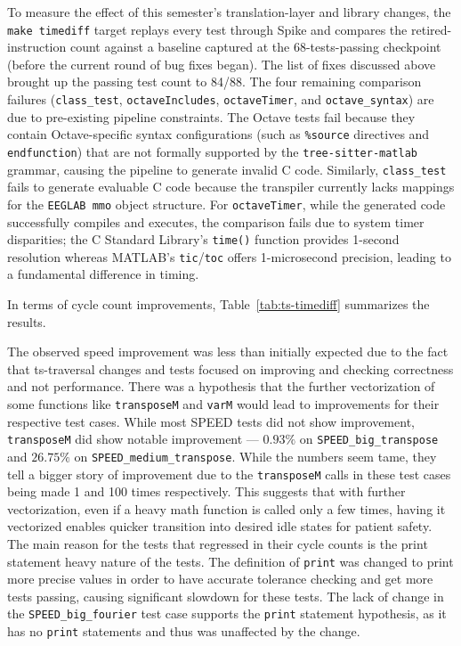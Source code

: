 To measure the effect of this semester's translation-layer and library changes, the \texttt{make timediff} target replays every test through Spike and compares the retired-instruction count against a baseline captured at the 68-tests-passing checkpoint (before the current round of bug fixes began). The list of fixes discussed above brought up the passing test count to 84/88.  The four remaining comparison failures (\texttt{class\_test}, \texttt{octaveIncludes}, \texttt{octaveTimer}, and \texttt{octave\_syntax}) are due to pre-existing pipeline constraints. The Octave tests fail because they contain Octave-specific syntax configurations (such as \texttt{\%source} directives and \texttt{endfunction}) that are not formally supported by the \texttt{tree-sitter-matlab} grammar, causing the pipeline to generate invalid C code. Similarly, \texttt{class\_test} fails to generate evaluable C code because the transpiler currently lacks mappings for the \texttt{EEGLAB mmo} object structure. For \texttt{octaveTimer}, while the generated code successfully compiles and executes, the comparison fails due to system timer disparities; the C Standard Library's \texttt{time()} function provides 1-second resolution whereas MATLAB's \texttt{tic}/\texttt{toc} offers 1-microsecond precision, leading to a fundamental difference in timing.

In terms of cycle count improvements, Table~\ref{tab:ts-timediff} summarizes the results.



The observed speed improvement was less than initially expected due to the fact that ts-traversal changes and tests focused on improving and checking correctness and not performance. There was a hypothesis that the further vectorization of some functions like \texttt{transposeM} and \texttt{varM} would lead to improvements for their respective test cases. While most SPEED tests did not show improvement, \texttt{transposeM} did show notable improvement --- $0.93\%$ on \texttt{SPEED\_big\_transpose} and $26.75\%$ on \texttt{SPEED\_medium\_transpose}. While the numbers seem tame, they tell a bigger story of improvement due to the \texttt{transposeM} calls in these test cases being made 1 and 100 times respectively. This suggests that with further vectorization, even if a heavy math function is called only a few times, having it vectorized enables quicker transition into desired idle states for patient safety. The main reason for the tests that regressed in their cycle counts is the print statement heavy nature of the tests. The definition of \texttt{print} was changed to print more precise values in order to have accurate tolerance checking and get more tests passing, causing significant slowdown for these tests. The lack of change in the \texttt{SPEED\_big\_fourier} test case supports the \texttt{print} statement hypothesis, as it has no \texttt{print} statements and thus was unaffected by the change.

